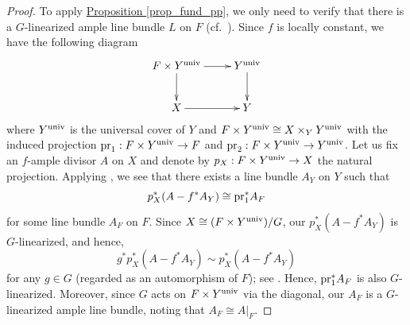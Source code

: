 \begin{proof}
To apply {\hyperref[prop_fund_pp]{Proposition  \ref*{prop_fund_pp}}}, we only need to verify that there is a $G$-linearized ample line bundle $L$ on $F$ (cf.~\cite[Definition 2.6]{MW21}). 
Since $f$ is locally constant, we have the following diagram
\[
\xymatrix{F\times Y^{\textup{univ}}\ar[r]\ar[d]&Y^{\text{univ}}\ar[d]\\
X\ar[r]&Y}
\]
where $Y^{\textup{univ}}$ is the universal cover of $Y$ and $F\times Y^{\textup{univ}}\cong X\times_Y Y^{\textup{univ}}$ with the induced projection $\textup{pr}_1: F\times Y^{\textup{univ}}\to F$ and  $\textup{pr}_2: F\times Y^{\textup{univ}}\to Y^{\textup{univ}}$.
Let us fix an $f$-ample divisor $A$ on $X$ and denote by $p_X: F\times Y^{\textup{univ}}\to X$ the natural projection.
Applying \cite[Proof of Lemma 2.7]{MW21}, we see that there exists a line bundle $A_Y$ on $Y$ such that 
$$p_X^*(A-f^*A_Y)\cong\textup{pr}_1^*A_F$$ 
for some line bundle $A_F$ on $F$.
Since $X\cong (F\times Y^{\textup{univ}})/G$, our $p_X^*(A-f^*A_Y)$ is $G$-linearized, and hence,  
$$g^*p_X^*(A-f^*A_Y)\sim p_X^*(A-f^*A_Y)$$ 
for any $g\in G$ (regarded as an automorphism of $F$); see \cite[Defintion 3.2.3, Lemma 3.2.4]{Brion18}.  
Hence, $\textup{pr}_1^*A_F$ is also $G$-linearized.
Moreover, since $G$ acts on $F\times Y^{\textup{univ}}$ via the diagonal, our $A_F$ is a $G$-linearized ample line bundle, noting that $A_F\cong A|_F$.
\end{proof}




\baselineskip

























